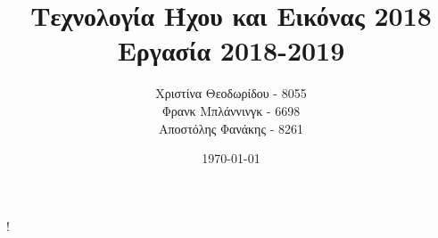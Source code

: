 \documentclass[11pt]{article}
\title{Τεχνολογία Ήχου και Εικόνας 2018\\
    Εργασία 2018-2019}
\author{Χριστίνα Θεοδωρίδου - 8055\\
    Φρανκ Μπλάννινγκ - 6698\\
    Αποστόλης Φανάκης - 8261}
\date{\today}
\begin{document}
  \maketitle
  \tableofcontents

  \newpage
  !
  
  
  
  

  
  {}
\end{document}
